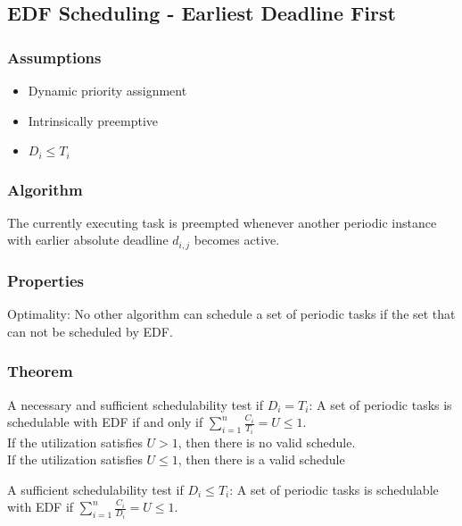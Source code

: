 \subsection{EDF Scheduling - Earliest Deadline First}

\subsubsection{Assumptions}
\begin{itemize}[noitemsep]
\item Dynamic priority assignment
\item Intrinsically preemptive
\item $D_i \leq T_i$
\end{itemize}

\subsubsection{Algorithm}
The currently executing task is preempted whenever another periodic instance with earlier absolute deadline $d_{i, j}$ becomes active.


\subsubsection{Properties}
Optimality: No other algorithm can schedule a set of 
periodic tasks if the set that can not be scheduled by EDF.


\subsubsection{Theorem}
\begin{theorem}
A necessary and sufficient schedulability test if $D_i = T_i$: A set of periodic tasks is schedulable with EDF if and only if $\sum\limits_{i = 1}^{n} \frac{C_i}{T_i } = U \leq 1$. \\
If the utilization satisfies $U > 1$, then there is no valid schedule. \\
If the utilization satisfies $U \leq 1$, then there is a valid
schedule
\end{theorem}

\begin{theorem}
A sufficient schedulability test if $D_i \leq T_i$: A set of periodic tasks is schedulable with EDF if $\sum\limits_{i = 1}^{n} \frac{C_i}{D_i } = U \leq 1$.
\end{theorem}

